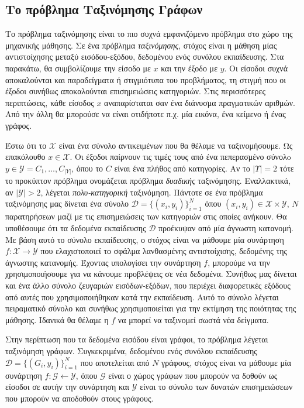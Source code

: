 \subsection{Το πρόβλημα Ταξινόμησης Γράφων}
\label{subsection:graph_classification}
Το πρόβλημα ταξινόμησης είναι το πιο συχνά εμφανιζόμενο πρόβλημα στο χώρο της μηχανικής μάθησης.
Σε ένα πρόβλημα \textit{ταξινόμησης}, στόχος είναι η μάθηση μίας αντιστοίχησης μεταξύ εισόδου-εξόδου, δεδομένου ενός συνόλου εκπαίδευσης.
Στα παρακάτω, θα συμβολίζουμε την είσοδο με $x$ και την έξοδο με $y$.
Οι είσοδοι συχνά αποκαλούνται και παραδείγματα ή στιγμιότυπα του προβλήματος, τη στιγμή που οι έξοδοι συνήθως αποκαλούνται επισημειώσεις κατηγοριών.
Στις περισσότερες περιπτώσεις, κάθε είσοδος $x$ αναπαρίσταται σαν ένα διάνυσμα πραγματικών αριθμών.
Από την άλλη θα μπορούσε να είναι οτιδήποτε π.χ. μία εικόνα, ένα κείμενο ή ένας γράφος.\par
Έστω ότι το $\mathcal{X}$ είναι ένα σύνολο αντικειμένων που θα θέλαμε να ταξινομήσουμε.
Ως επακόλουθο $x \in \mathcal{X}$.
Οι έξοδοι παίρνουν τις τιμές τους από ένα πεπερασμένο σύνολo $y \in \mathcal{Y} = {C_{1}, \dots, C_{|Y|}}$, όπου το $C$ είναι ένα πλήθος από κατηγορίες.
Αν το $|\mathcal{Υ}| = 2$ τότε το προκύπτον πρόβλημα ονομάζεται πρόβλημα \textit{δυαδικής} ταξινόμησης.
Εναλλακτικά, αν $|\mathcal{Y}| > 2$, λέγεται \textit{πολυ-κατηγορική} ταξινόμηση.
Πάντοτε σε ένα πρόβλημα ταξινόμησης μας δίνεται ένα σύνολο $\mathcal{D} = \{(x_{i}, y_{i})\}^{N}_{i=1}$ όπου $(x_{i}, y_{i}) \in \mathcal{X} \times \mathcal{Y}$, $Ν$ παρατηρήσεων μαζί με τις επισημειώσεις των κατηγοριών στις οποίες ανήκουν.
Θα υποθέσουμε ότι τα δεδομένα εκπαίδευσης $\mathcal{D}$ προέκυψαν από μία άγνωστη κατανομή.
Με βάση αυτό το σύνολο εκπαίδευσης, ο στόχος είναι να μάθουμε μία συνάρτηση $f: \mathcal{X} \rightarrow \mathcal{Y}$ που ελαχιστοποιεί το σφάλμα λανθασμένης αντιστοίχισης, δεδομένης της άγνωστης κατανομής.
Έχοντας υπολογίσει την συνάρτηση $f$, μπορούμε να την χρησιμοποιήσουμε για να κάνουμε προβλέψεις σε νέα δεδομένα.
Συνήθως μας δίνεται και ένα άλλο σύνολο ζευγαριών εισόδων-εξόδων, που περιέχει διαφορετικές εξόδους από αυτές που χρησιμοποιήθηκαν κατά την εκπαίδευση.
Αυτό το σύνολο λέγεται πειραματικό σύνολο και συνήθως χρησιμοποιείται για την εκτίμηση της ποιότητας της μάθησης.
Ιδανικά θα θέλαμε η $f$ να μπορεί να ταξινομεί σωστά νέα δείγματα.\par
Στην περίπτωση που τα δεδομένα εισόδου είναι γράφοι, το πρόβλημα λέγεται ταξινόμηση γράφων.
Συγκεκριμένα, δεδομένου ενός συνόλου εκπαίδευσης $\mathcal{D} = \{(G_{i}, y_{i})\}^{N}_{i=1}$ που αποτελείται από $N$ γράφους, στόχος είναι να μάθουμε μία συνάρτηση $f: \mathcal{G} \leftarrow \mathcal{Y}$, όπου $\mathcal{G}$ είναι ο χώρος γράφων που μπορούν να δοθούν ως είσοδοι σε αυτήν την συνάρτηση και $\mathcal{Y}$ είναι το σύνολο των δυνατών επισημειώσεων που μπορούν να αποδοθούν στους γράφους.
